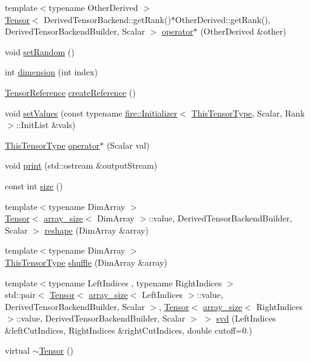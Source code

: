 \begin{DoxyCompactItemize}
\item 
{\footnotesize template$<$typename Other\+Derived $>$ }\\\hyperlink{a00046}{Tensor}$<$ Derived\+Tensor\+Backend\+::get\+Rank()$\ast$Other\+Derived\+::get\+Rank(), Derived\+Tensor\+Backend\+Builder, Scalar $>$ \hyperlink{a00046_a34e8084c1faebbe6191703fe56f03efe}{operator$\ast$} (Other\+Derived \&other)
\item 
void \hyperlink{a00046_acbe638bc3fbd75bf67f4a25467f95594}{set\+Random} ()
\item 
int \hyperlink{a00046_aa2f9181f6fab4a276ef2c9b1637af912}{dimension} (int index)
\item 
\hyperlink{a00103_a744d7805ef98562de55f32012ab11cfb}{Tensor\+Reference} \hyperlink{a00046_a3c1837cc6e1134bb5c244882a419d554}{create\+Reference} ()
\item 
void \hyperlink{a00046_a1ba79b5076cb6483929fc33bd06d1485}{set\+Values} (const typename \hyperlink{a00021}{fire\+::\+Initializer}$<$ \hyperlink{a00046_ac86105ceb5e209854b2554a755024bd4}{This\+Tensor\+Type}, Scalar, Rank $>$\+::Init\+List \&vals)
\item 
\hyperlink{a00046_ac86105ceb5e209854b2554a755024bd4}{This\+Tensor\+Type} \hyperlink{a00046_a6de8950823ff713b7226e332b02f15f8}{operator$\ast$} (Scalar val)
\item 
void \hyperlink{a00046_a98fae67b5aa6dfdc9ccc429e72a92d64}{print} (std\+::ostream \&output\+Stream)
\item 
const int \hyperlink{a00046_a595b6b9b26549cc2d866e1780fb7a91f}{size} ()
\item 
{\footnotesize template$<$typename Dim\+Array $>$ }\\\hyperlink{a00046}{Tensor}$<$ \hyperlink{a00007}{array\+\_\+size}$<$ Dim\+Array $>$\+::value, Derived\+Tensor\+Backend\+Builder, Scalar $>$ \hyperlink{a00046_a8b91fdabf1e86609c808c79788ed47cf}{reshape} (Dim\+Array \&array)
\item 
{\footnotesize template$<$typename Dim\+Array $>$ }\\\hyperlink{a00046_ac86105ceb5e209854b2554a755024bd4}{This\+Tensor\+Type} \hyperlink{a00046_a79a2c542999f0c99f5bacbf0542e6b49}{shuffle} (Dim\+Array \&array)
\item 
{\footnotesize template$<$typename Left\+Indices , typename Right\+Indices $>$ }\\std\+::pair$<$ \hyperlink{a00046}{Tensor}$<$ \hyperlink{a00007}{array\+\_\+size}$<$ Left\+Indices $>$\+::value, Derived\+Tensor\+Backend\+Builder, Scalar $>$, \hyperlink{a00046}{Tensor}$<$ \hyperlink{a00007}{array\+\_\+size}$<$ Right\+Indices $>$\+::value, Derived\+Tensor\+Backend\+Builder, Scalar $>$ $>$ \hyperlink{a00046_af7efdb39e4c6a7cfaba794c5ad26542a}{svd} (Left\+Indices \&left\+Cut\+Indices, Right\+Indices \&right\+Cut\+Indices, double cutoff=0.)
\item 
virtual \hyperlink{a00046_aa788e02d5dcd996a0f8b69777ff24bc2}{$\sim$\+Tensor} ()
\end{DoxyCompactItemize}
